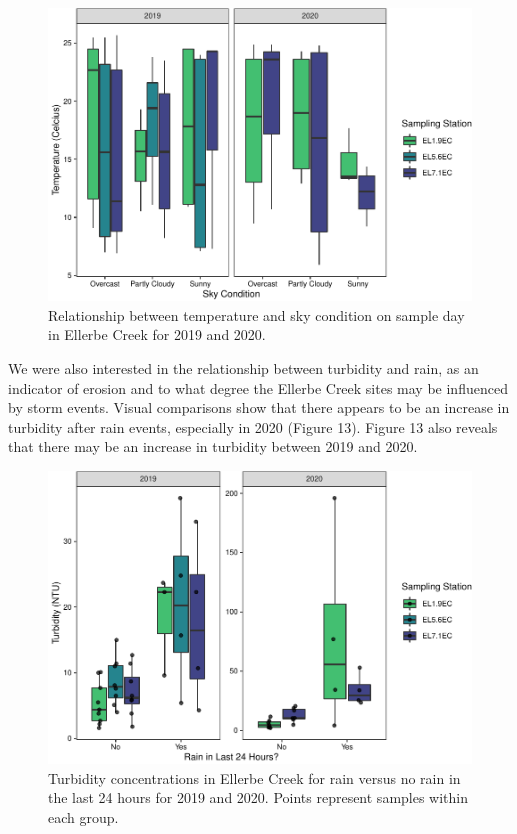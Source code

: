 \documentclass[
  12pt,
]{article}
\begin{document}
\begin{figure}
\centering
\includegraphics{August_Lindborg_ENV872_Project_files/figure-latex/unnamed-chunk-13-1.pdf}
\caption{Relationship between temperature and sky condition on sample
day in Ellerbe Creek for 2019 and 2020.}
\end{figure}

\newpage

We were also interested in the relationship between turbidity and rain,
as an indicator of erosion and to what degree the Ellerbe Creek sites
may be influenced by storm events. Visual comparisons show that there
appears to be an increase in turbidity after rain events, especially in
2020 (Figure 13). Figure 13 also reveals that there may be an increase
in turbidity between 2019 and 2020.

\begin{figure}
\centering
\includegraphics{August_Lindborg_ENV872_Project_files/figure-latex/unnamed-chunk-14-1.pdf}
\caption{Turbidity concentrations in Ellerbe Creek for rain versus no
rain in the last 24 hours for 2019 and 2020. Points represent samples
within each group.}
\end{figure}
\end{document}
